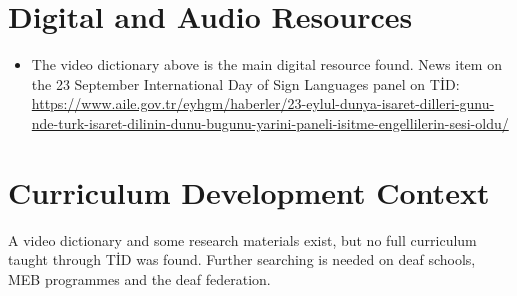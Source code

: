 \documentclass[12pt]{article}
\begin{document}
\section{Digital and Audio Resources}
\begin{itemize}
\item The video dictionary above is the main digital resource found. News item on the 23 September International Day of Sign Languages panel on T\.{I}D: \url{https://www.aile.gov.tr/eyhgm/haberler/23-eylul-dunya-isaret-dilleri-gunu-nde-turk-isaret-dilinin-dunu-bugunu-yarini-paneli-isitme-engellilerin-sesi-oldu/}
\end{itemize}

\section{Curriculum Development Context}
A video dictionary and some research materials exist, but no full curriculum taught through T\.{I}D was found. Further searching is needed on deaf schools, MEB programmes and the deaf federation.
\end{document}

